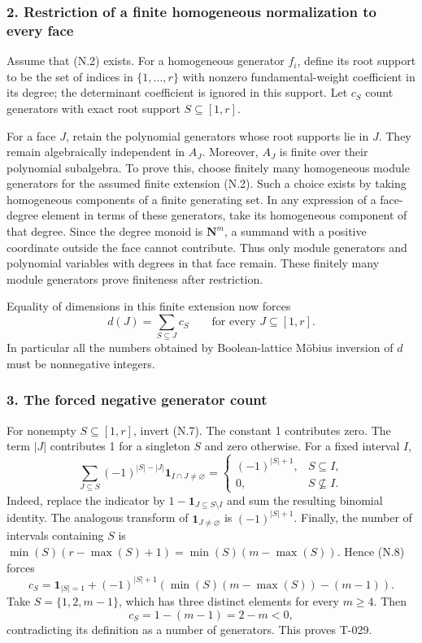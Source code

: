 \documentclass[
  10pt,
]{article}
\begin{document}
\subsubsection{2. Restriction of a finite homogeneous normalization to
every
face}\label{restriction-of-a-finite-homogeneous-normalization-to-every-face}

Assume that (N.2) exists. For a homogeneous generator \(f_i\), define
its root support to be the set of indices in \(\{1,\ldots,r\}\) with
nonzero fundamental-weight coefficient in its degree; the determinant
coefficient is ignored in this support. Let \(c_S\) count generators
with exact root support \(S\subseteq[1,r]\).

For a face \(J\), retain the polynomial generators whose root supports
lie in \(J\). They remain algebraically independent in \(A_J\).
Moreover, \(A_J\) is finite over their polynomial subalgebra. To prove
this, choose finitely many homogeneous module generators for the assumed
finite extension (N.2). Such a choice exists by taking homogeneous
components of a finite generating set. In any expression of a
face-degree element in terms of these generators, take its homogeneous
component of that degree. Since the degree monoid is \(\mathbf N^m\), a
summand with a positive coordinate outside the face cannot contribute.
Thus only module generators and polynomial variables with degrees in
that face remain. These finitely many module generators prove finiteness
after restriction.

Equality of dimensions in this finite extension now forces \[
d(J)=\sum_{S\subseteq J}c_S\qquad\text{for every }J\subseteq[1,r].
\tag{N.8}
\] In particular all the numbers obtained by Boolean-lattice Möbius
inversion of \(d\) must be nonnegative integers.

\subsubsection{3. The forced negative generator
count}\label{the-forced-negative-generator-count}

For nonempty \(S\subseteq[1,r]\), invert (N.7). The constant 1
contributes zero. The term \(|J|\) contributes 1 for a singleton \(S\)
and zero otherwise. For a fixed interval \(I\), \[
\sum_{J\subseteq S}(-1)^{|S|-|J|}\mathbf1_{I\cap J\ne\varnothing}
=\begin{cases}(-1)^{|S|+1},&S\subseteq I,\\0,&S\not\subseteq I.\end{cases}
\tag{N.9}
\] Indeed, replace the indicator by
\(1-\mathbf1_{J\subseteq S\setminus I}\) and sum the resulting binomial
identity. The analogous transform of \(\mathbf1_{J\ne\varnothing}\) is
\((-1)^{|S|+1}\). Finally, the number of intervals containing \(S\) is
\(\min(S)(r-\max(S)+1)=\min(S)(m-\max(S))\). Hence (N.8) forces \[
\boxed{
c_S=\mathbf1_{|S|=1}
+(-1)^{|S|+1}\left(\min(S)(m-\max(S))-(m-1)\right).}
\tag{N.10}
\] Take \(S=\{1,2,m-1\}\), which has three distinct elements for every
\(m\ge4\). Then \[
c_S=1-(m-1)=2-m<0,
\] contradicting its definition as a number of generators. This proves
T-029.
\end{document}
